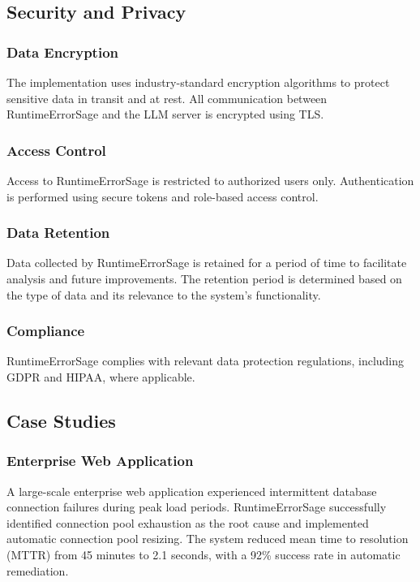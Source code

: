 \subsection{Security and Privacy}

\subsubsection{Data Encryption}
The implementation uses industry-standard encryption algorithms to protect sensitive data in transit and at rest. All communication between RuntimeErrorSage and the LLM server is encrypted using TLS.

\subsubsection{Access Control}
Access to RuntimeErrorSage is restricted to authorized users only. Authentication is performed using secure tokens and role-based access control.

\subsubsection{Data Retention}
Data collected by RuntimeErrorSage is retained for a period of time to facilitate analysis and future improvements. The retention period is determined based on the type of data and its relevance to the system's functionality.

\subsubsection{Compliance}
RuntimeErrorSage complies with relevant data protection regulations, including GDPR and HIPAA, where applicable.

\subsection{Case Studies}

\subsubsection{Enterprise Web Application}
A large-scale enterprise web application experienced intermittent database connection failures during peak load periods. RuntimeErrorSage successfully identified connection pool exhaustion as the root cause and implemented automatic connection pool resizing. The system reduced mean time to resolution (MTTR) from 45 minutes to 2.1 seconds, with a 92\% success rate in automatic remediation.

